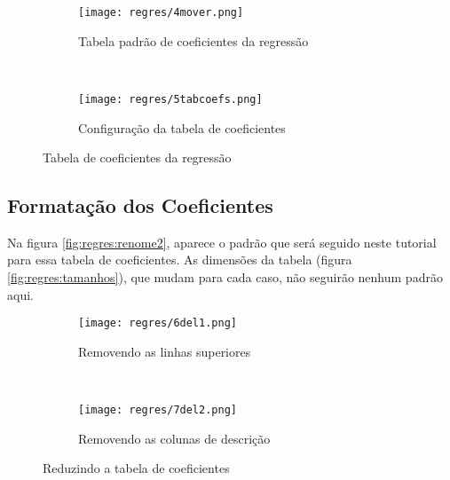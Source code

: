     \begin{figure}[htbp]
        \centering
        \begin{subfigure}{0.45\textwidth}
            \centering
            \texttt{[image: regres/4mover.png]}

            \caption{Tabela padrão de coeficientes da regressão}
            \label{fig:regres:coefspadrao}
        \end{subfigure}
        ~
        \begin{subfigure}{0.50\textwidth}
            \centering
            \texttt{[image: regres/5tabcoefs.png]}

            \caption{Configuração da tabela de coeficientes}
            \label{fig:regres:tabcoefs}
        \end{subfigure}
        \caption{Tabela de coeficientes da regressão}
        \label{fig:regres:coefs}
    \end{figure}


\subsection{Formatação dos Coeficientes}

    Na figura \ref{fig:regres:renome2}, aparece o padrão que será seguido neste tutorial para essa tabela de coeficientes. As dimensões da tabela (figura \ref{fig:regres:tamanhos}), que mudam para cada caso, não seguirão nenhum padrão aqui.

    \begin{figure}[htbp]
        \centering
        \begin{subfigure}{0.45\textwidth}
            \centering
            \texttt{[image: regres/6del1.png]}

            \caption{Removendo as linhas superiores}
            \label{fig:regres:del1}
        \end{subfigure}
        ~
        \begin{subfigure}{0.450\textwidth}
            \centering
            \texttt{[image: regres/7del2.png]}

            \caption{Removendo as colunas de descrição}
            \label{fig:regres:del2}
        \end{subfigure}
        \caption{Reduzindo a tabela de coeficientes}
        \label{fig:regres:del}
    \end{figure}

